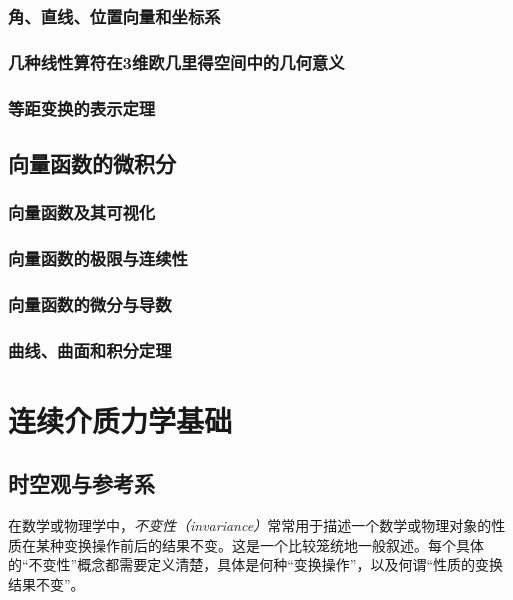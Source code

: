 \documentclass[zihao=-4,linespread=1.5,a4paper,heading=true,twoside]{ctexbook}
\theoremstyle{definition}
\theoremstyle{plain}
\begin{document}
\section{角、直线、位置向量和坐标系}\label{sec:II.3.2}


\section{几种线性算符在3维欧几里得空间中的几何意义}\label{sec:II.3.3}


\section{等距变换的表示定理}\label{sec:II.3.4}




\chapter{向量函数的微积分}\label{sec:II.4}
\section{向量函数及其可视化}\label{sec:II.4.1}


\section{向量函数的极限与连续性}\label{sec:II.4.2}


\section{向量函数的微分与导数}\label{sec:II.4.3}


\section{曲线、曲面和积分定理}\label{sec:II.4.4}


\part{连续介质力学基础}
\chapter{时空观与参考系}
在数学或物理学中，\emph{不变性（invariance）}常常用于描述一个数学或物理对象的性质在某种变换操作前后的结果不变。这是一个比较笼统地一般叙述。每个具体的“不变性”概念都需要定义清楚，具体是何种“变换操作”，以及何谓“性质的变换结果不变”。
\end{document}
